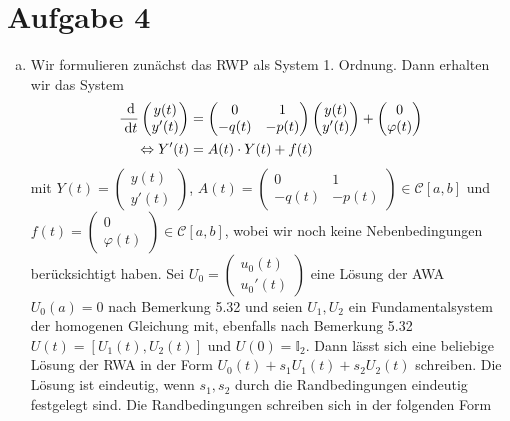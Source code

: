 \documentclass{article}
\theoremstyle{definition}
\newcommand{\dv}[2]{\frac{\d #1 }{\d #2 }}
\begin{document}
\section*{Aufgabe 4}
\begin{enumerate}[(a)]
\item 
Wir formulieren zunächst das RWP als System 1. Ordnung. Dann erhalten wir das System
\begin{align*}
	\dv{}{t} \begin{pmatrix}
		y(t)\\y'(t)
	\end{pmatrix} &= \begin{pmatrix}
		0 & 1\\
		-q(t)& - p(t)
	\end{pmatrix} \begin{pmatrix}
		y(t)\\y'(t)
	\end{pmatrix} + \begin{pmatrix}
		0\\\varphi(t)
	\end{pmatrix}\\
	\Leftrightarrow Y'(t) &= A(t) \cdot Y(t) + f(t)
\end{align*} mit $Y(t) = \begin{pmatrix}
	y(t)\\y'(t)
\end{pmatrix}$, $A(t) = \begin{pmatrix}
	0 & 1\\
	-q(t)& - p(t)
\end{pmatrix}\in \mathcal{C}[a,b]$ und $f(t) = \begin{pmatrix}
	0\\\varphi(t)
\end{pmatrix} \in \mathcal{C}[a,b]$, wobei wir noch keine Nebenbedingungen berücksichtigt haben. Sei $U_0 = \begin{pmatrix}
	u_0(t)\\u_0'(t)
\end{pmatrix}$ eine Lösung der AWA $U_0(a) = 0$ nach Bemerkung 5.32 und seien $U_1, U_2$ ein Fundamentalsystem der homogenen Gleichung mit, ebenfalls nach Bemerkung 5.32 
$U(t) = \left[U_1(t),U_2(t)\right]$ und $U(0) = \mathbb{I}_2$. Dann lässt sich eine beliebige Lösung der RWA in der Form $U_0(t) + s_1U_1(t) + s_2U_2(t)$ schreiben. Die Lösung ist eindeutig, wenn $s_1, s_2$ durch die Randbedingungen eindeutig festgelegt sind. Die Randbedingungen schreiben sich in der folgenden Form
\begin{align*}

\end{align*}
\end{enumerate}
\end{document}
